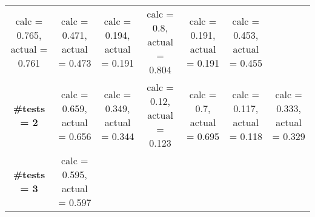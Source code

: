 \documentclass[
]{article}
\begin{document}
\begin{longtable}[]{@{}ccccccc@{}}
\begin{minipage}[t]{0.12\columnwidth}
calc = 0.765, actual = 0.761\strut
\end{minipage} & \begin{minipage}[t]{0.12\columnwidth}\centering
calc = 0.471, actual = 0.473\strut
\end{minipage} & \begin{minipage}[t]{0.12\columnwidth}\centering
calc = 0.194, actual = 0.191\strut
\end{minipage} & \begin{minipage}[t]{0.12\columnwidth}\centering
calc = 0.8, actual = 0.804\strut
\end{minipage} & \begin{minipage}[t]{0.12\columnwidth}\centering
calc = 0.191, actual = 0.191\strut
\end{minipage} & \begin{minipage}[t]{0.12\columnwidth}\centering
calc = 0.453, actual = 0.455\strut
\end{minipage}\tabularnewline
\begin{minipage}[t]{0.07\columnwidth}\centering
\textbf{\#tests = 2}\strut
\end{minipage} & \begin{minipage}[t]{0.12\columnwidth}\centering
calc = 0.659, actual = 0.656\strut
\end{minipage} & \begin{minipage}[t]{0.12\columnwidth}\centering
calc = 0.349, actual = 0.344\strut
\end{minipage} & \begin{minipage}[t]{0.12\columnwidth}\centering
calc = 0.12, actual = 0.123\strut
\end{minipage} & \begin{minipage}[t]{0.12\columnwidth}\centering
calc = 0.7, actual = 0.695\strut
\end{minipage} & \begin{minipage}[t]{0.12\columnwidth}\centering
calc = 0.117, actual = 0.118\strut
\end{minipage} & \begin{minipage}[t]{0.12\columnwidth}\centering
calc = 0.333, actual = 0.329\strut
\end{minipage}\tabularnewline
\begin{minipage}[t]{0.07\columnwidth}\centering
\textbf{\#tests = 3}\strut
\end{minipage} & \begin{minipage}[t]{0.12\columnwidth}\centering
calc = 0.595, actual = 0.597\strut
\end{minipage} & \begin{minipage}[t]{0.12\columnwidth}\centering

\end{minipage}
\end{longtable}
\end{document}
